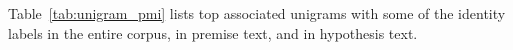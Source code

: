 \documentclass[11pt]{article}
\begin{document}
    Table~\ref{tab:unigram_pmi} lists top associated unigrams with some of the identity labels in the entire corpus,
    in premise text, and in hypothesis text.

    \clearpage
    
    



\end{document}
